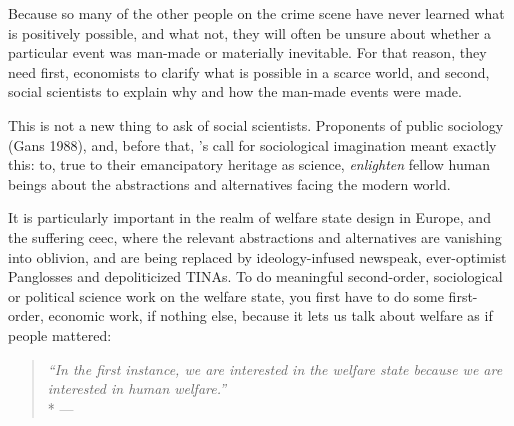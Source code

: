 Because so many of the other people on the crime scene have never learned what is positively possible, and what not, they will often be unsure about whether a particular event was man-made or materially inevitable.
For that reason, they need first, economists to clarify what is possible in a scarce world, and second, social scientists to explain why and how the man-made events were made.

This is not a new thing to ask of social scientists.
Proponents of public sociology (Gans 1988), and, before that, \citeauthor{Mills-1959-aa}'s call for sociological imagination meant exactly this:
to, true to their emancipatory heritage as science, \emph{enlighten} fellow human beings about the abstractions and alternatives facing the modern world.

It is particularly important in the realm of welfare state design in Europe, and the suffering \gls{ceec}, where the relevant abstractions and alternatives are vanishing into oblivion, and are being replaced by ideology-infused newspeak, ever-optimist Panglosses and depoliticized TINAs.
To do meaningful second-order, sociological or political science work on the welfare state, you first have to do some first-order, economic work, if nothing else, because it lets us talk about welfare as if people mattered:

\begin{quote}
	\emph{``In the first instance, we are interested in the welfare state because we are interested in human welfare.''}
	\\*
	--- \citet*[236]{Haggard2009}
\end{quote}

